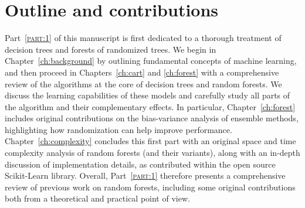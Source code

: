 \documentclass[twoside,openright,titlepage,numbers=noenddot,headinclude,%
               footinclude=true,cleardoublepage=empty,abstractoff,BCOR=5mm,%
               paper=a4,fontsize=11pt,ngerman,american]{scrreprt}
\numberwithin{theorem}{chapter}
\numberwithin{definition}{chapter}
\numberwithin{algorithm}{chapter}
\numberwithin{figure}{chapter}
\numberwithin{table}{chapter}
\numberwithin{equation}{chapter}
\begin{document}
\section{Outline and contributions}

Part~\textsc{\ref{part:1}} of this manuscript is first dedicated to a thorough
treatment of decision trees and forests of randomized trees. We begin in
Chapter~\ref{ch:background} by outlining fundamental concepts of machine
learning, and then proceed in Chapters~\ref{ch:cart} and \ref{ch:forest} with a
comprehensive review of the algorithms at the core of decision trees and random
forests. We discuss the learning capabilities of these models and carefully
study all parts of the algorithm and their complementary effects. In particular,
Chapter~\ref{ch:forest} includes original contributions on the bias-variance
analysis of ensemble methods, highlighting how randomization can help improve
performance. Chapter~\ref{ch:complexity} concludes this first part with an
original space and time complexity analysis of random forests (and their
variants), along with an in-depth discussion of implementation details,
as contributed within the open source Scikit-Learn library.
Overall, Part~\textsc{\ref{part:1}} therefore presents a comprehensive review
of previous work on random forests, including some original contributions
both from a theoretical and practical point of view.
\end{document}
